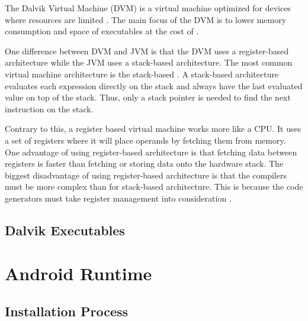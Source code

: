 The Dalvik Virtual Machine (DVM) is a virtual machine optimized for devices where resources are limited \cite{android:dalvik:internals}. The main focus of the DVM is to lower memory consumption and space of executables at the cost of \cite{security2009analysis}. 


One difference between DVM and JVM is that the DVM uses a register-based architecture while the JVM uses a stack-based architecture. The most common virtual machine architecture is the stack-based \cite[p.~158]{craig2010virtual}. A stack-based architecture evaluates each expression directly on the stack and always have the last evaluated value on top of the stack. Thus, only a stack pointer is needed to find the next instruction on the stack.

Contrary to this, a register based virtual machine works more like a CPU. It uses a set of registers where it will place operands by fetching them from memory. One advantage of using register-based architecture is that fetching data between registers is faster than fetching or storing data onto the hardware stack. The biggest disadvantage of using register-based architecture is that the compilers must be more complex than for stack-based architecture. This is because the code generators must take register management into consideration \cite[p.~159-160]{craig2010virtual}.


\subsection{Dalvik Executables}



\section{Android Runtime}



\subsection{Installation Process}

